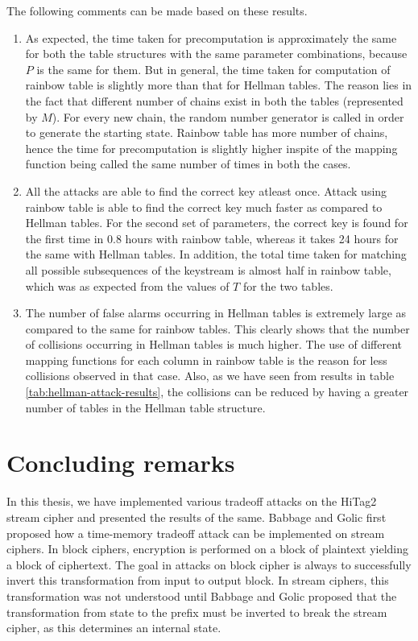 The following comments can be made based on these results.
\begin{enumerate}
\item As expected, the time taken for precomputation is approximately the same for both the table structures with the same parameter combinations, because $P$ is the same for them. But in general, the time taken for computation of rainbow table is slightly more than that for Hellman tables. The reason lies in the fact that different number of chains exist in both the tables (represented by $M$). For every new chain, the random number generator is called in order to generate the starting state. Rainbow table has more number of chains, hence the time for precomputation is slightly higher inspite of the mapping function being called the same number of times in both the cases. 
  
\item All the attacks are able to find the correct key atleast once. Attack using rainbow table is able to find the correct key much faster as compared to Hellman tables. For the second set of parameters, the correct key is found for the first time in 0.8 hours with rainbow table, whereas it takes 24 hours for the same with Hellman tables. In addition, the total time taken for matching all possible subsequences of the keystream is almost half in rainbow table, which was as expected from the values of $T$ for the two tables.

\item The number of false alarms occurring in Hellman tables is extremely large as compared to the same for rainbow tables. This clearly shows that the number of collisions occurring in Hellman tables is much higher. The use of different mapping functions for each column in rainbow table is the reason for less collisions observed in that case. Also, as we have seen from results in table \ref{tab:hellman-attack-results}, the collisions can be reduced by having a greater number of tables in the Hellman table structure.
\end{enumerate}

\newpage
\section{Concluding remarks}

In this thesis, we have implemented various tradeoff attacks on the HiTag2 stream cipher and presented the results of the same. Babbage and Golic first proposed how a time-memory tradeoff attack can be implemented on stream ciphers. In block ciphers, encryption is performed on a block of plaintext yielding a block of ciphertext. The goal in attacks on block cipher is always to successfully invert this transformation from input to output block. In stream ciphers, this transformation was not understood until Babbage and Golic proposed that the transformation from state to the prefix must be inverted to break the stream cipher, as this determines an internal state. 

